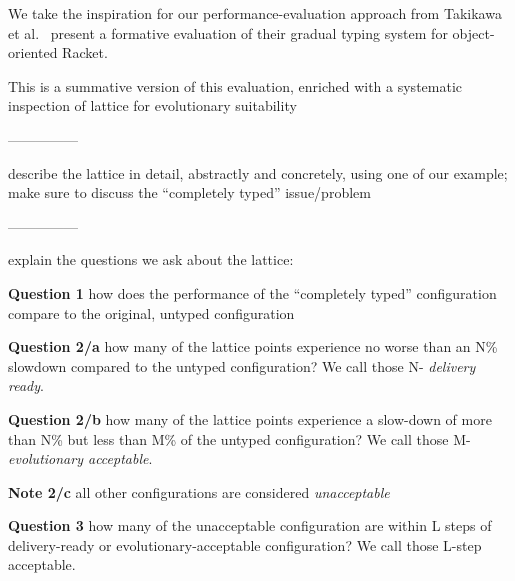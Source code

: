 
We take the inspiration for our performance-evaluation approach from
 Takikawa et al.~\cite{asumu:practical} present a formative evaluation of
 their gradual typing system for object-oriented Racket. 

This is a summative version of this evaluation, enriched with a systematic
inspection of lattice for evolutionary suitability 

 ---------------

describe the lattice in detail, abstractly and concretely, using one of our
example; make sure to discuss the ``completely typed'' issue/problem 

---------------

explain the questions we ask about the lattice: 

{\bf Question 1} how does the performance of the ``completely typed'' configuration
compare to the original, untyped configuration 

{\bf Question 2/a} how many of the lattice points experience no worse than an N\%
slowdown compared to the untyped configuration? We call those N-{\it
delivery ready\/}.

{\bf Question 2/b} how many of the lattice points experience a slow-down of more
than N\% but less than M\% of the untyped configuration? We call those
M-{\it evolutionary acceptable\/}.

{\bf Note 2/c} all other configurations are considered {\it unacceptable\/}

{\bf Question 3} how many of the unacceptable configuration are within L
steps of delivery-ready or evolutionary-acceptable configuration? We call
those L-step acceptable. 


